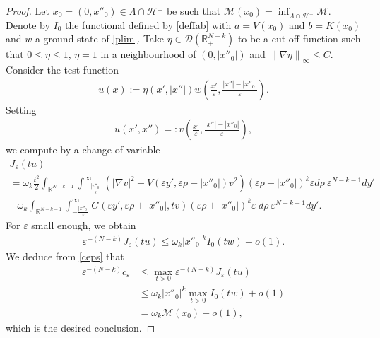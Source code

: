 \documentclass[a4paper]{amsart}
\begin{document}
\begin{proof}
Let $x_0=(0, x''_0) \in \Lambda \cap \mathcal{H}^\perp$ be such that $\mathcal{M}(x_0)=\inf_{\Lambda \cap \mathcal{H}^\perp} \mathcal{M}$.
Denote by $I_0$ the functional defined by \eqref{defIab} with $a = V(x_0)$ and $b = K(x_0)$ and $w$ a ground state of \eqref{plim}. Take $\eta \in \mathcal{D}\left( {\mathbb{R}}^{N-k}_+ \right)$ to be a cut-off function
such that $0 \leq \eta \leq 1$, $\eta = 1$ in a neighbourhood of $(0, 	{\left| {x''_0} \right|})$ and ${\left\| {\nabla\eta} \right\|}_{\infty} \leq
C$. Consider the test function
\begin{align*}
 u(x) := \eta(x',{\left| {x''} \right|}) w\left(\frac{x'}{\varepsilon}, \frac{{\left| {x''} \right|}-{\left| {x''_0} \right|}}{\varepsilon}\right).
\end{align*}
Setting
\begin{align*}
 u(x',x'') =: v\left(\frac{x'}{\varepsilon}, \frac{{\left| {x''} \right|}-{\left| {x''_0} \right|}}{\varepsilon}\right),
\end{align*}
we compute by a change of variable
\begin{multline*}
 J_{\varepsilon}(tu) \\
 
= \omega_k \frac{t^2}{2} \int_{{\mathbb{R}}^{N-k-1}} \int_{-\frac{{\left| {x''_0} \right|}}{\varepsilon}}^{\infty} \left( {\left| {\nabla v} \right|}^2 +
V(\varepsilon y',\varepsilon \rho + {\left| {x''_0} \right|}) v^2 \right) (\varepsilon \rho +{\left| {x''_0} \right|})^{k} \varepsilon d\rho\:
\varepsilon^{N-k-1} dy'\\ - \omega_k \int_{{\mathbb{R}}^{N-k-1}} \int_{-\frac{{\left| {x''_0} \right|}}{\varepsilon}}^{\infty} G(\varepsilon
y',\varepsilon \rho + {\left| {x''_0} \right|},tv) (\varepsilon \rho + {\left| {x''_0} \right|})^{k} \varepsilon\: d\rho\: \varepsilon^{N-k-1} dy'.
\end{multline*}
For $\varepsilon$ small enough, we obtain 
\begin{align}\label{estimc1}
 \varepsilon^{-(N-k)} J_{\varepsilon}(tu) \leq \omega_k {\left| {x''_0} \right|}^{k} I_0(tw) + o(1).
\end{align}
We deduce from \eqref{ceps} that
\[
\begin{split}
 \varepsilon^{-(N-k)} c_{\varepsilon} &\leq \max_{t > 0} \varepsilon^{-(N-k)} J_{\varepsilon}(tu)  \\
&\leq \omega_k {\left| {x''_0} \right|}^{k} \max_{t > 0} I_0(tw) + o(1)  \\
&= \omega_k \mathcal{M}(x_0)+ o(1),
\end{split}
\]
which is the desired conclusion.
\end{proof}
\end{document}
